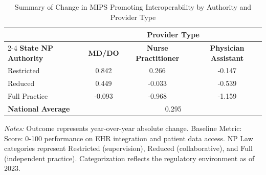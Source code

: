 \begin{table}[htbp]
    \centering
    \caption{Summary of Change in MIPS Promoting Interoperability by Authority and Provider Type}
    \label{tab:d_mips_pi_score_provtype}
    \vspace{0.2cm}
    \begin{tabular}{lccc}
        \toprule
        & \multicolumn{3}{c}{\textbf{Provider Type}} \\
        \cmidrule(lr){2-4}
        \textbf{State NP Authority} & \textbf{MD/DO} & \textbf{Nurse Practitioner} & \textbf{Physician Assistant} \\
        \midrule
        Restricted & 0.842 & 0.266 & -0.147 \\
        Reduced & 0.449 & -0.033 & -0.539 \\
        Full Practice & -0.093 & -0.968 & -1.159 \\
        \midrule
        \textbf{National Average} & \multicolumn{3}{c}{0.295} \\
        \bottomrule
    \end{tabular}
    \vspace{0.1cm}
    \begin{minipage}{0.85\textwidth}
        \footnotesize \textit{Notes:} Outcome represents year-over-year absolute change. Baseline Metric: Score: 0-100 performance on EHR integration and patient data access. NP Law categories represent Restricted (supervision), Reduced (collaborative), and Full (independent practice). Categorization reflects the regulatory environment as of 2023.
    \end{minipage}
\end{table}